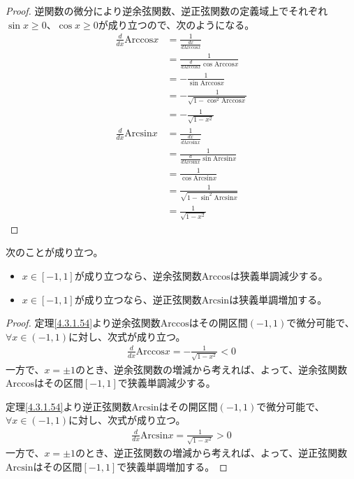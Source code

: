 \documentclass[dvipdfmx]{jsarticle}
\begin{document}
\begin{proof}
逆関数の微分により逆余弦関数、逆正弦関数の定義域上でそれぞれ$\sin x \geq 0$、$\cos x \geq 0$が成り立つので、次のようになる。
\begin{align*}
\frac{d}{dx}{\mathrm{Arccos}}x &= \frac{1}{\frac{dx}{d{\mathrm{Arccos}}x}}\\
&= \frac{1}{\frac{d}{d{\mathrm{Arccos}}x}\cos{{\mathrm{Arccos}}x}}\\
&= - \frac{1}{\sin{{\mathrm{Arccos}}x}}\\
&= - \frac{1}{\sqrt{1 - \cos^{2}{{\mathrm{Arccos}}x}}}\\
&= - \frac{1}{\sqrt{1 - x^{2}}}\\
\frac{d}{dx}{\mathrm{Arcsin}}x &= \frac{1}{\frac{dx}{d{\mathrm{Arcsin}}x}}\\
&= \frac{1}{\frac{d}{d{\mathrm{Arcsin}}x}\sin{{\mathrm{Arcsin}}x}}\\
&= \frac{1}{\cos{{\mathrm{Arcsin}}x}}\\
&= \frac{1}{\sqrt{1 - \sin^{2}{{\mathrm{Arcsin}}x}}}\\
&= \frac{1}{\sqrt{1 - x^{2}}}
\end{align*}
\end{proof}
\begin{thm}\label{4.3.1.55} 次のことが成り立つ。
\begin{itemize}
\item
  $x \in [ - 1,1]$が成り立つなら、逆余弦関数$\mathrm{Arccos}$は狭義単調減少する。
\item
  $x \in [ - 1,1]$が成り立つなら、逆正弦関数$\mathrm{Arcsin}$は狭義単調増加する。
\end{itemize}
\end{thm}
\begin{proof} 定理\ref{4.3.1.54}より逆余弦関数$\mathrm{Arccos}$はその開区間$( - 1,1)$で微分可能で、$\forall x \in ( - 1,1)$に対し、次式が成り立つ。
\begin{align*}
\frac{d}{dx}{\mathrm{Arccos}}x = - \frac{1}{\sqrt{1 - x^{2}}} < 0
\end{align*}
一方で、$x = \pm 1$のとき、逆余弦関数の増減から考えれば、よって、逆余弦関数$\mathrm{Arccos}$はその区間$[ - 1,1]$で狭義単調減少する。\par
定理\ref{4.3.1.54}より逆正弦関数$\mathrm{Arcsin}$はその開区間$( - 1,1)$で微分可能で、$\forall x \in ( - 1,1)$に対し、次式が成り立つ。
\begin{align*}
\frac{d}{dx}{\mathrm{Arcsin}}x = \frac{1}{\sqrt{1 - x^{2}}} > 0
\end{align*}
一方で、$x = \pm 1$のとき、逆正弦関数の増減から考えれば、よって、逆正弦関数$\mathrm{Arcsin}$はその区間$[ - 1,1]$で狭義単調増加する。
\end{proof}
\end{document}
